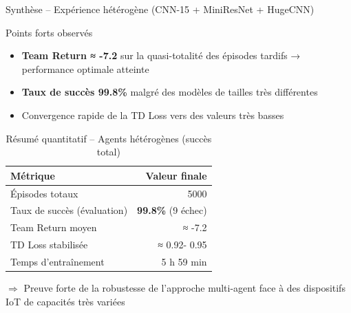 \documentclass[aspectratio=169]{beamer}
\begin{document}
\begin{frame}{Synthèse – Expérience hétérogène (CNN-15 + MiniResNet + HugeCNN)}
\begin{block}{Points forts observés}
\begin{itemize}
    \item \textbf{Team Return ≈ -7.2} sur la quasi-totalité des épisodes tardifs → performance optimale atteinte
    \item \textbf{Taux de succès 99.8\%} malgré des modèles de tailles très différentes
    \item Convergence rapide de la TD Loss vers des valeurs très basses
\end{itemize}
\end{block}

\begin{table}[]
\footnotesize\centering
\renewcommand{\arraystretch}{1.3}
\begin{tabular}{lr}
\toprule
Métrique                              & Valeur finale                  \\
\midrule
Épisodes totaux                       & 5000                           \\
Taux de succès (évaluation)           & \textbf{99.8\%} (9 échec)     \\
Team Return moyen & ≈ -7.2                     \\
TD Loss stabilisée                    & ≈ 0.92- 0.95                    \\
Temps d'entraînement                  & 5 h 59 min                     \\
\bottomrule
\end{tabular}
\caption{Résumé quantitatif – Agents hétérogènes (succès total)}
\end{table}

\small\centering
$\Rightarrow$ Preuve forte de la robustesse de l’approche multi-agent face à des dispositifs IoT de capacités très variées
\end{frame}
\end{document}
